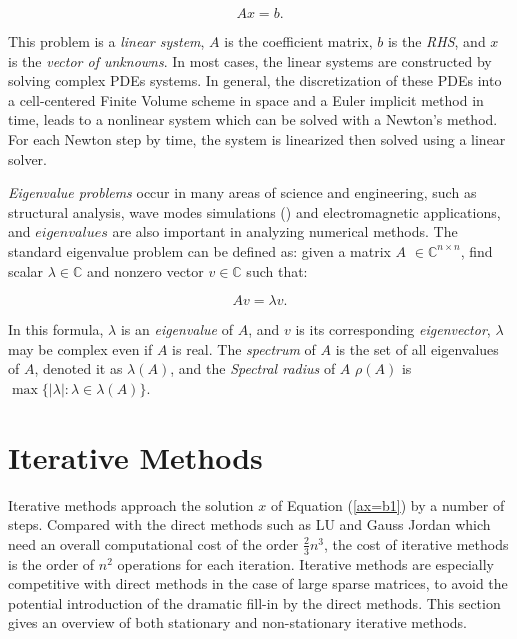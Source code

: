 \begin{equation}
\label{ax=b1}
Ax=b.
\end{equation}

This problem is a \textit{linear system}, $A$ is the coefficient matrix, $b$ is the \textit{RHS}, and $x$ is the \textit{vector of unknowns}. In most cases, the linear systems are constructed by solving complex PDEs systems. In general, the discretization of these PDEs into a cell-centered Finite Volume scheme in space and a Euler implicit method in time, leads to a nonlinear system which can be solved with a Newton’s method. For each Newton step by time, the system is linearized then solved using a linear solver.

\textit{Eigenvalue problems} occur in many areas of science and engineering, such as structural analysis, wave modes simulations (\cite{liu2018highly}) and electromagnetic applications, and $eigenvalues$ are also important in analyzing numerical methods. The standard eigenvalue problem can be defined as: given a matrix $A$ $\in \mathbb{C}^{n \times n}$, find scalar $\lambda \in \mathbb{C}$ and nonzero vector $v \in \mathbb{C}$ such that: 

\begin{equation}
\label{av=lv}
Av=\lambda v.
\end{equation}

In this formula, $\lambda$ is an \textit{eigenvalue} of $A$, and $v$ is its corresponding \textit{eigenvector}, $\lambda$ may be complex even if $A$ is real. The \textit{spectrum} of $A$ is the set of all eigenvalues of $A$, denoted it as $\lambda(A)$, and the \textit{Spectral radius} of $A$ $\rho(A)$ is $\max\{|\lambda|: \lambda \in \lambda(A)\}$. 

\section{Iterative Methods}

Iterative methods approach the solution $x$ of Equation (\ref{ax=b1}) by a number of steps. Compared with the direct methods such as LU and Gauss Jordan which need an overall computational cost of the order $\frac{2}{3}n^3$, the cost of iterative methods is the order of $n^2$ operations for each iteration. Iterative methods are especially competitive with direct methods in the case of large sparse matrices, to avoid the potential introduction of the dramatic fill-in by the direct methods. This section gives an overview of both stationary and non-stationary iterative methods.

